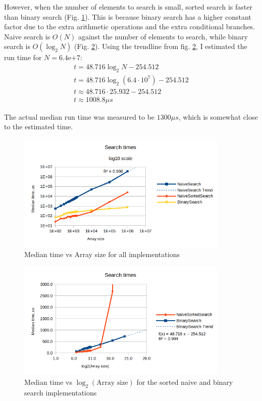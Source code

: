 \documentclass[a4paper,11pt]{article}
\begin{document}
    However, when the number of elements to search is small, sorted search is faster than binary search (Fig. \ref{fig:log-search-chart}). This is because binary search has a higher constant factor due to the extra arithmetic operations and the extra conditional branches. Naive search is $O(N)$ against the number of elements to search, while binary search is $O(\log_2{N})$ (Fig. \ref{fig:log2-search-chart}). Using the trendline from fig. \ref{fig:log2-search-chart}, I estimated the run time for $N=6.4\mathrm{e}{+7}$:
    \begin{gather*}
        t = 48.716 \log_2{N} - 254.512 \\
        t = 48.716 \log_2{\left(6.4 \cdot 10^7\right)} - 254.512 \\
        t \approx 48.716 \cdot 25.932 - 254.512 \\
        t \approx 1008.8 \mu s
    \end{gather*}

    The actual median run time was measured to be $1300 \mu s$, which is somewhat close to the estimated time.

    \begin{figure}[H]
        \centering
        \includegraphics[width=0.9\textwidth]{logsearch.png}
        \caption{Median time vs Array size for all implementations}
        \label{fig:log-search-chart}
    \end{figure}

    \begin{figure}[H]
        \centering
        \includegraphics[width=0.9\textwidth]{log2search.png}
        \caption{Median time vs $\log_2{\left(\text{Array size}\right)}$ for the sorted naive and binary search implementations}
        \label{fig:log2-search-chart}
    \end{figure}
\end{document}
